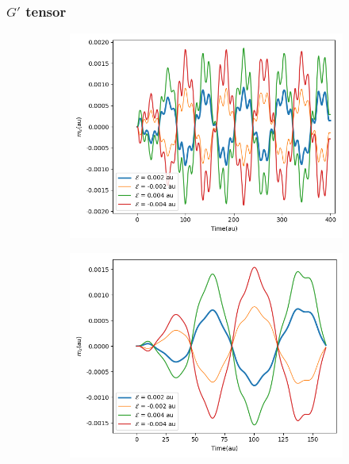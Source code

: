 \subsubsection{$G'$ tensor}\label{results-cc3-23}
\begin{figure}
     \centering
     \begin{subfigure}{0.47\textwidth}
         \centering
         \includegraphics[width=\textwidth]{ch4/Figs/5-1.png}
     \end{subfigure}
     \hfill
     \begin{subfigure}{0.47\textwidth}
         \centering
         \includegraphics[width=\textwidth]{ch4/Figs/5-3.png}
     \end{subfigure}

\end{figure}
